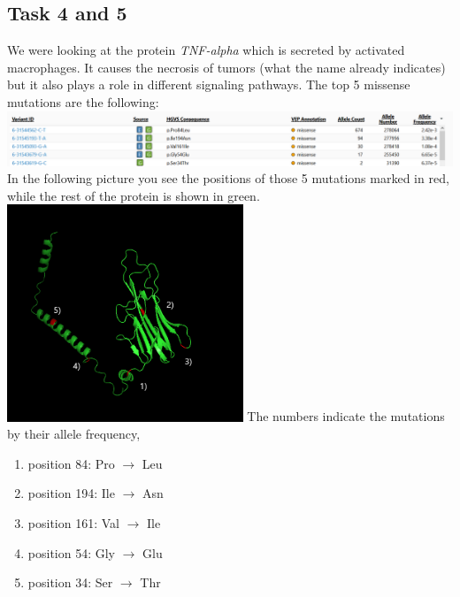 \documentclass[]{article}
\begin{document}
\subsection{Task 4 and 5}
We were looking at the protein \textit{TNF-alpha} which is secreted by activated macrophages. It causes the necrosis of tumors (what the name already indicates) but it also plays a role in different signaling pathways.\newline
The top 5 missense mutations are the following:\newline
\includegraphics[height=15ex, width=450pt]{mutations.png}
\newpage
\noindent In the following picture you see the positions of those 5 mutations marked in red, while the rest of the protein is shown in green.\newline
\includegraphics[height=40ex, width=200pt]{mutation_3d_small.png}
\newline
\newline
The numbers indicate the mutations by their allele frequency,
\begin{enumerate}[1)]
	\item position 84: Pro $\rightarrow$ Leu
	\item position 194: Ile $\rightarrow$ Asn
	\item position 161: Val $\rightarrow$ Ile
	\item position 54: Gly $\rightarrow$ Glu
	\item position 34: Ser $\rightarrow$ Thr
\end{enumerate}
\end{document}
